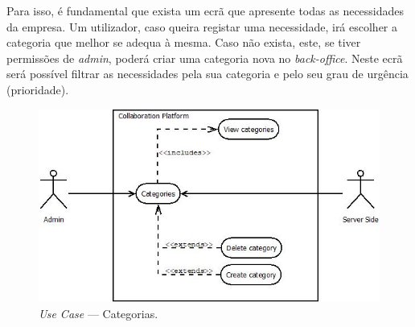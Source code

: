Para isso, é fundamental que exista um ecrã que apresente todas as necessidades da empresa. 
Um utilizador, caso queira registar uma necessidade, irá escolher a categoria que melhor se adequa à mesma. 
Caso não exista, este, se tiver permissões de \textit{admin}, poderá criar uma categoria nova no \textit{back-office}. 
Neste ecrã será possível filtrar as necessidades pela sua categoria e pelo seu grau de urgência (prioridade).

\begin{figure}[H]
    \centering
    \includegraphics[scale=0.6]{figures/Categories use case.jpeg}
    \caption{\textit{Use Case} --- Categorias.}\label{fig:uc:categories}
\end{figure}

